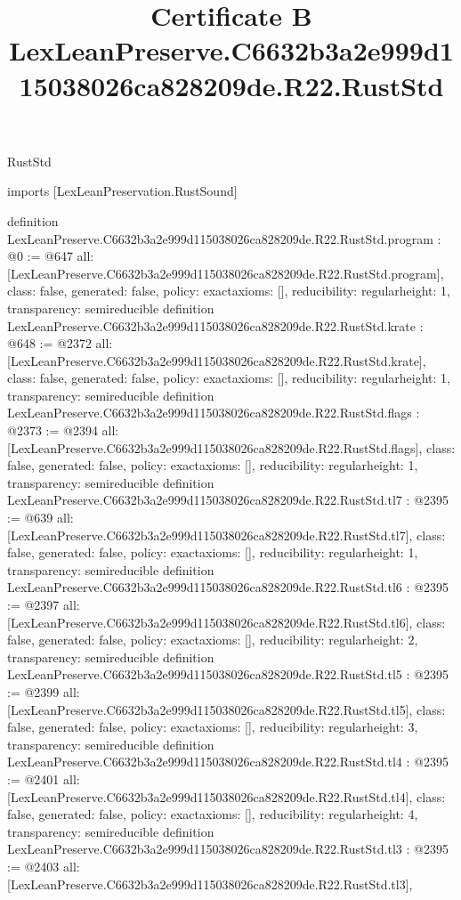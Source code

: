 \begin{lexlean}{RustStd}
\title{Certificate B LexLeanPreserve.C6632b3a2e999d115038026ca828209de.R22.RustStd}
\begin{coremodule}
imports [LexLeanPreservation.RustSound]

definition LexLeanPreserve.C6632b3a2e999d115038026ca828209de.R22.RustStd.program : @0 := @647 {
  all: [LexLeanPreserve.C6632b3a2e999d115038026ca828209de.R22.RustStd.program],
  class: false,
  generated: false,
  policy: exact{axioms: []},
  reducibility: regular{height: 1},
  transparency: semireducible
}
definition LexLeanPreserve.C6632b3a2e999d115038026ca828209de.R22.RustStd.krate : @648 := @2372 {
  all: [LexLeanPreserve.C6632b3a2e999d115038026ca828209de.R22.RustStd.krate],
  class: false,
  generated: false,
  policy: exact{axioms: []},
  reducibility: regular{height: 1},
  transparency: semireducible
}
definition LexLeanPreserve.C6632b3a2e999d115038026ca828209de.R22.RustStd.flags : @2373 := @2394 {
  all: [LexLeanPreserve.C6632b3a2e999d115038026ca828209de.R22.RustStd.flags],
  class: false,
  generated: false,
  policy: exact{axioms: []},
  reducibility: regular{height: 1},
  transparency: semireducible
}
definition LexLeanPreserve.C6632b3a2e999d115038026ca828209de.R22.RustStd.tl7 : @2395 := @639 {
  all: [LexLeanPreserve.C6632b3a2e999d115038026ca828209de.R22.RustStd.tl7],
  class: false,
  generated: false,
  policy: exact{axioms: []},
  reducibility: regular{height: 1},
  transparency: semireducible
}
definition LexLeanPreserve.C6632b3a2e999d115038026ca828209de.R22.RustStd.tl6 : @2395 := @2397 {
  all: [LexLeanPreserve.C6632b3a2e999d115038026ca828209de.R22.RustStd.tl6],
  class: false,
  generated: false,
  policy: exact{axioms: []},
  reducibility: regular{height: 2},
  transparency: semireducible
}
definition LexLeanPreserve.C6632b3a2e999d115038026ca828209de.R22.RustStd.tl5 : @2395 := @2399 {
  all: [LexLeanPreserve.C6632b3a2e999d115038026ca828209de.R22.RustStd.tl5],
  class: false,
  generated: false,
  policy: exact{axioms: []},
  reducibility: regular{height: 3},
  transparency: semireducible
}
definition LexLeanPreserve.C6632b3a2e999d115038026ca828209de.R22.RustStd.tl4 : @2395 := @2401 {
  all: [LexLeanPreserve.C6632b3a2e999d115038026ca828209de.R22.RustStd.tl4],
  class: false,
  generated: false,
  policy: exact{axioms: []},
  reducibility: regular{height: 4},
  transparency: semireducible
}
definition LexLeanPreserve.C6632b3a2e999d115038026ca828209de.R22.RustStd.tl3 : @2395 := @2403 {
  all: [LexLeanPreserve.C6632b3a2e999d115038026ca828209de.R22.RustStd.tl3],
}
\end{coremodule}
\end{lexlean}
